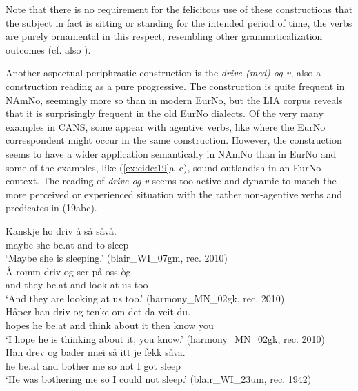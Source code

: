 \documentclass[output=paper]{langscibook}
\begin{document}
Note that there is no requirement for the felicitous use of these constructions that the subject in fact is sitting or standing for the intended period of time, the verbs are purely ornamental in this respect, resembling other grammaticalization outcomes (cf. also \citealt{Lødrup2019}). 

Another aspectual periphrastic construction is the \textit{drive (med) og v,} also a construction reading as a pure progressive. The construction is quite frequent in NAmNo, seemingly more so than in modern EurNo, but the LIA corpus reveals that it is surprisingly frequent in the old EurNo dialects. Of the very many examples in CANS, some appear with agentive verbs, like  where the EurNo correspondent might occur in the same construction. However, the construction seems to have a wider application semantically in NAmNo than in EurNo and some of the examples, like (\ref{ex:eide:19}a--c), sound outlandish in an EurNo context. The reading of \textit{drive og v} seems too active and dynamic to match the more perceived or experienced situation with the rather non-agentive verbs and predicates in (19abc).  

\ea%
    \label{ex:eide:19}
    \ea \label{ex:eide:19a} 
    \gll     Kanskje ho driv å så såvå.        \\
             maybe she be.at and to sleep        \\
    \glt     ‘Maybe she is sleeping.’ (blair\_WI\_07gm, rec. 2010)\\
    \ex \label{ex:eide:19b}
    \gll Å romm driv og ser på oss òg.     \\
         and they be.at and look at us too \\
    \glt ‘And they are looking at us too.’ (harmony\_MN\_02gk, rec. 2010)\\
    \ex \label{ex:eide:19c}  
    \gll Håper han driv og tenke om det da veit du.    \\
         hopes he be.at and think about it then know you\\
    \glt ‘I hope he is thinking about it, you know.’ (harmony\_MN\_02gk, rec. 2010)\\
    \ex \label{ex:eide:19d}  
    \gll  Han drev og bader mæi så itt je fekk såva. \\
          he be.at and bother me so not I got sleep  \\
    \glt  ‘He was bothering me so I could not sleep.’ (blair\_WI\_23um, rec. 1942)\\
    \z %
\z
\end{document}
